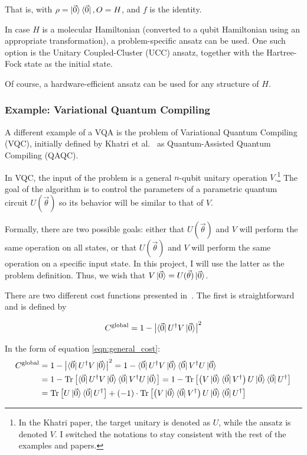 \documentclass[a4paper,12pt]{article}
\newcommand{\thetas}{\vec{\theta}}
\DeclareMathOperator{\tr}{Tr}
\begin{document}
That is, with $\rho = \ket{\vec{0}}\bra{\vec{0}}, O=H$, and $f$ is the identity.

In case $H$ is a molecular Hamiltonian (converted to a qubit Hamiltonian using an appropriate transformation), a problem-specific ansatz can be used. One such option is the Unitary Coupled-Cluster (UCC) ansatz, together with the Hartree-Fock state as the initial state.

Of course, a hardware-efficient ansatz can be used for any structure of $H$.

\subsubsection{Example: Variational Quantum Compiling} \label{subsec:vqc}
A different example of a VQA is the problem of Variational Quantum Compiling (VQC), initially defined by Khatri et al.~\cite{khatri_quantum-assisted_2019} as Quantum-Assisted Quantum Compiling (QAQC).

In VQC, the input of the problem is a general $n$-qubit unitary operation $V$.\footnote{In the Khatri paper, the target unitary is denoted as $U$, while the ansatz is denoted $V$. I switched the notations to stay consistent with the rest of the examples and papers.} The goal of the algorithm is to control the parameters of a parametric quantum circuit $U(\thetas)$ so its behavior will be similar to that of $V$.

Formally, there are two possible goals: either that $U(\thetas)$ and $V$ will perform the same operation on all states, or that $U(\thetas)$ and $V$ will perform the same operation on a specific input state.
In this project, I will use the latter as the problem definition. Thus, we wish that $V\ket{\vec{0}} = U(\thetas)\ket{\vec{0}}$.

There are two different cost functions presented in~\cite{khatri_quantum-assisted_2019}.
The first is straightforward and is defined by

\begin{equation}
    C^{\textrm{global}} = 1 - \left|\bra{\vec{0}}U^\dagger V\ket{\vec{0}}\right|^2
\end{equation}

In the form of equation \ref{eqn:general_cost}:
\begin{align*}
    C^{\textrm{global}} &= 1 - \left|\bra{\vec{0}}U^\dagger V\ket{\vec{0}}\right|^2
    = 1 - \bra{\vec{0}}U^\dagger V\ket{\vec{0}}\bra{\vec{0}}V^\dagger U\ket{\vec{0}} \\
    &= 1 - \tr \left[ \bra{\vec{0}}U^\dagger V\ket{\vec{0}}\bra{\vec{0}}V^\dagger U\ket{\vec{0}} \right]
    = 1 - \tr \left[  \left(V\ket{\vec{0}}\bra{\vec{0}}V^\dagger\right) U\ket{\vec{0}} \bra{\vec{0}}U^\dagger \right] \\
    &= \tr \left[ U \ket{\vec{0}}\bra{\vec{0}} U^\dagger \right] + (-1) \cdot \tr \left[  \left(V\ket{\vec{0}}\bra{\vec{0}}V^\dagger\right) U\ket{\vec{0}} \bra{\vec{0}}U^\dagger \right]
\end{align*}
\end{document}
